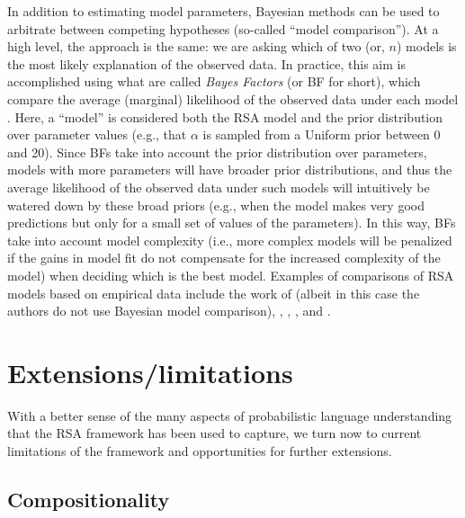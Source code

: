 \documentclass{sp}
\begin{document}
In addition to estimating model parameters, Bayesian methods can be used to arbitrate between competing hypotheses (so-called ``model comparison''). At a high level, the approach is the same: we are asking which of two (or, $n$) models is the most likely explanation of the observed data. In practice, this aim is accomplished using what are called \emph{Bayes Factors} (or BF for short), which compare the average (marginal) likelihood of the observed data under each model \citep{Jeffreys1961:Theory-of-Proba,KassRaftery1995:Bayes-Factors}. Here, a ``model'' is considered both the RSA model and the prior distribution over parameter values (e.g., that $\alpha$ is sampled from a Uniform prior between 0 and 20). Since BFs take into account the prior distribution over parameters, models with more parameters will have broader prior distributions, and thus the average likelihood of the observed data under such models will intuitively be  watered down by these broad priors (e.g., when the model makes very good predictions but only for a small set of values of the parameters). In this way, BFs take into account model complexity (i.e., more complex models will be penalized if the gains in model fit do not compensate for the increased complexity of the model) when deciding which is the best model.
Examples of comparisons of RSA models based on empirical data include the work of \citet{PottsLassiter2016:Embedded-implic} (albeit in this case the authors do not use Bayesian model comparison), \citet{qingfranke2015}, \citet{FrankeBergen2020:Theory-driven-s}, \citet{yoonetal2020}, and \cite{bohn2019predicting}.

\section{Extensions/limitations} \label{limitations}

With a better sense of the many aspects of probabilistic language understanding that the RSA framework has been used to capture, we turn now to current limitations of the framework and opportunities for further extensions.

\subsection{Compositionality}
\end{document}
